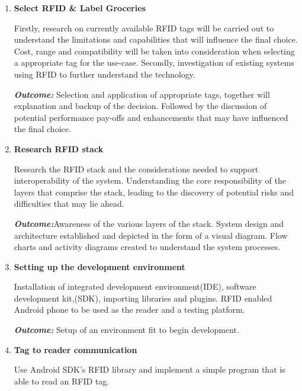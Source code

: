 \documentclass[a4paper, 11pt]{article}
\begin{document}
\begin{enumerate}
    \item \textbf{Select RFID \& Label Groceries}
   	\begin{flushleft}Firstly, research on currently available RFID tags will be carried out to understand the limitations and capabilities that will influence the final choice. Cost, range and compatibility will be taken into consideration when selecting a appropriate tag for the use-case. Secondly, investigation of existing systems using RFID to further understand the technology. 
	
	\emph{\textbf{Outcome:}} Selection and application of appropriate tags, together will explanation and backup of the decision. Followed by the discussion of potential performance pay-offs and enhancements that may have influenced the final choice.
	  	\end{flushleft}
	  \vspace{\baselineskip}

   \item \textbf{Research RFID stack}
   	\begin{flushleft}Research the RFID stack and the considerations needed to support interoperability of the system. Understanding the core responsibility of the layers that comprise the stack, leading to the discovery of potential risks and difficulties that may lie ahead.
	
	\emph{\textbf{Outcome:}}Awareness of the various layers of the stack. System design and architecture established and depicted in the form of a visual diagram. Flow charts and activity diagrams created to understand the system processes. 
	\end{flushleft}
	  \vspace{\baselineskip}
   \item \textbf{Setting up the development environment}
   	\begin{flushleft}Installation of integrated development environment(IDE), software development kit,(SDK), importing libraries and plugins. RFID enabled Android phone to be used as the reader and a testing platform.  
		
		\emph{\textbf{Outcome:}}  Setup of an environment fit to begin development.
		\end{flushleft}
	  \vspace{\baselineskip}
	   \item \textbf{Tag to reader communication}
   	\begin{flushleft}Use Android SDK's RFID library and implement a simple program that is able to read an RFID tag.
		

\end{flushleft}
\end{enumerate}
\end{document}
